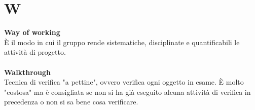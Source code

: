 \section{W}
\textbf{Way of working}\\
È il modo in cui il gruppo rende sistematiche, disciplinate e quantificabili le attività di progetto. \\ \\
\textbf{Walkthrough}\\
Tecnica di verifica "a pettine", ovvero verifica ogni oggetto in esame. È molto "costosa" ma è consigliata se non si ha già eseguito alcuna attività di verifica in precedenza o non si sa bene cosa verificare.
\clearpage